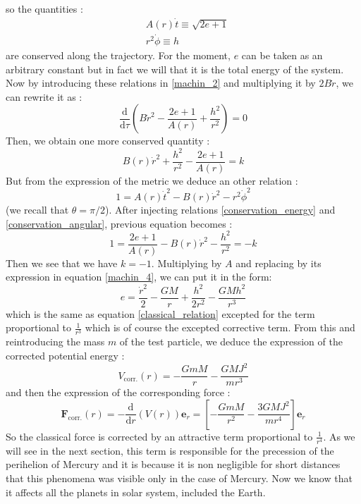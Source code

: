 %
so the quantities :
%
\begin{subequations}
 \begin{align}
  &A(r) \dot{t} \equiv \sqrt{2e + 1}\label{conservation_energy}\\
  &r^2\dot{\phi} \equiv h \label{conservation_angular}
  \end{align}
\end{subequations}
%
are conserved along the trajectory. For the moment, $e$ can be taken as an arbitrary constant but in fact we will that it is 
the total energy of the system.
Now by introducing these relations in \eqref{machin_2} and multiplying it by $2B\dot{r}$, we can rewrite it as :
%
\begin{equation}
 \frac{\mathrm{d}}{\mathrm{d}\tau}\left(B{\dot{r}}^2 - \frac{2e+1}{A(r)} + \frac{h^2}{r^2}\right) = 0
\end{equation}
%
Then, we obtain one more conserved quantity : 
%
\begin{equation} \label{machin_4}
  B(r)\dot{r}^2 + \frac{h^2}{r^2} - \frac{2e+1}{A(r)} = k  
\end{equation}
%
But from the expression of the metric we deduce an other relation :
\begin{equation}
 1 = A(r)\dot{t}^2 - B(r) \dot{r}^2 - r^2\dot{\phi}^2 
\end{equation}
%
(we recall that $\theta = \pi/2$). After injecting relations \eqref{conservation_energy} and \eqref{conservation_angular}, previous equation becomes :
\begin{equation}
 1 = \frac{2e+1}{A(r)} - B(r) \dot{r}^2 - \frac{h^2}{r^2} = -k
\end{equation}
%
Then we see that we have $k=-1$.
Multiplying by $A$ and replacing by its expression in equation \eqref{machin_4}, we can put it in the form:
%
\begin{equation}
 e = \frac{\dot{r}^2}{2} - \frac{GM}{r} + \frac{h^2}{2r^2} - \frac{GMh^2}{r^3}
\end{equation}
%
which is the same as equation \eqref{classical_relation} excepted for the term proportional to $\frac{1}{r^3}$ which is of course 
the excepted corrective term. From this and 
reintroducing the mass $m$ of the test particle, we deduce the expression of the corrected potential energy :
%
\begin{equation}
 V_{\mathrm{corr.}}(r) = -\frac{GmM}{r} - \frac{GMJ^2}{mr^3}
\end{equation}
%
and then the expression of the corresponding force :
%
\begin{equation}
	 \mathbf{F}_{\mathrm{corr.}}(r) = - \frac{\mathrm{d}}{\mathrm{d}r} \left(V(r)\right)\mathbf{e}_r = \left[-\frac{GmM}{r^2} - \frac{3GMJ^2}{mr^4}\right] \mathbf{e}_r
\end{equation}
%
So the classical force is corrected by an attractive term proportional to $\frac{1}{r^4}$. As we will see in the next section, this term is responsible for
the precession of the perihelion of Mercury and it is because it is non negligible for short distances that this phenomena was visible only in the case of Mercury.
Now we know that it affects all the planets in solar system, included the Earth.